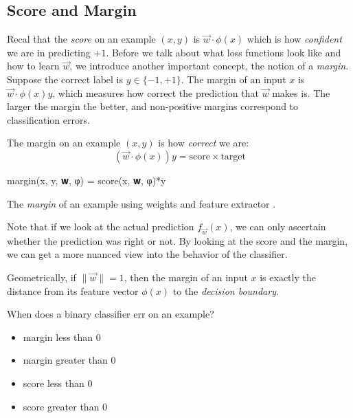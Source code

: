 
\subsection{Score and Margin} %
\label{sub:score_and_margin}



Recal that the \textit{score} on an example $(x,y)$ is $\vec{w}\cdot \phi(x)$ which is how \textit{confident} we are in predicting $+1$.
Before we talk about what loss functions look like and how to learn $\vec{w}$,
we introduce another important concept, the notion of a \textit{margin}.
Suppose the correct label is $y \in \{-1,+1\}$.
The margin of an input $x$ is $\vec{w} \cdot \phi(x) y$, which measures how correct the prediction that $\vec{w}$ makes is.
The larger the margin the better, and non-positive margins correspond to classification errors.

\begin{example}
     The margin on an example $(x,y)$ is how \textit{correct} we are:
    \[
        (\vec{w}\cdot\phi(x))y = \text{score} \times \text{target}
    \]
\end{example}

\begin{algorithm}
\begin{juliaverbatim}
margin(x, y, 𝐰, φ) = score(x, 𝐰, φ)*y
\end{juliaverbatim}

\caption{
    \label{alg:margin}
    The \textit{margin} of an example  using weights  and feature extractor .
}
\end{algorithm}
Note that if we look at the actual prediction $f_{\vec{w}}(x)$,
we can only ascertain whether the prediction was right or not.
By looking at the score and the margin, we can get a more nuanced view into the behavior of the classifier.

Geometrically, if $\|\vec{w}\| = 1$, then the margin of an input $x$ is exactly the distance from its feature vector $\phi(x)$ to the \textit{decision boundary}.

\begin{example}
     When does a binary classifier err on an example?
    \begin{itemize}
        \item margin less than $0$ %
        \item margin greater than $0$
        \item score less than $0$
        \item score greater than $0$
    \end{itemize}
\end{example}

